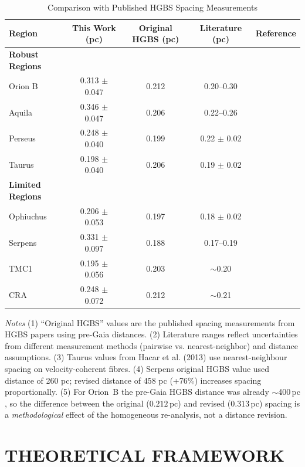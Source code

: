 \documentclass[usenatbib,twoside,twocolumn]{mnras}
\begin{document}
\begin{table}
\caption{Comparison with Published HGBS Spacing Measurements}
\label{tab:literature}
\begin{tabular}{lcccc}
\toprule
Region & This Work (pc) & Original HGBS (pc) & Literature (pc) & Reference \\
\midrule
\textbf{Robust Regions} &  &  &  &  \\
Orion B & 0.313 $\pm$ 0.047 & 0.212 & 0.20--0.30 & \citet{Konyves2020} \\
Aquila  & 0.346 $\pm$ 0.047 & 0.206 & 0.22--0.26 & \citet{Konyves2015} \\
Perseus & 0.248 $\pm$ 0.040 & 0.199 & 0.22 $\pm$ 0.02 & \citet{Pezzuto2021} \\
Taurus  & 0.198 $\pm$ 0.040 & 0.206 & 0.19 $\pm$ 0.02 & \citet{Hacar2013} \\
\midrule
\textbf{Limited Regions} &  &  &  &  \\
Ophiuchus & 0.206 $\pm$ 0.053 & 0.197 & 0.18 $\pm$ 0.02 & \citet{Konyves2020} \\
Serpens  & 0.331 $\pm$ 0.097 & 0.188 & 0.17--0.19 & \citet{Konyves2020} \\
TMC1     & 0.195 $\pm$ 0.056 & 0.203 & $\sim$0.20 & \citet{Hacar2013} \\
CRA      & 0.248 $\pm$ 0.072 & 0.212 & $\sim$0.21 & \citet{Konyves2020} \\
\bottomrule
\end{tabular}

\vspace{0.1in}
\footnotesize
\emph{Notes} (1) ``Original HGBS'' values are the published spacing measurements from HGBS papers using pre-Gaia distances. (2) Literature ranges reflect uncertainties from different measurement methods (pairwise vs. nearest-neighbor) and distance assumptions. (3) Taurus values from Hacar et al. (2013) use nearest-neighbour spacing on velocity-coherent fibres. (4) Serpens original HGBS value used distance of 260 pc; revised distance of 458 pc (+76\%) increases spacing proportionally. (5) For Orion~B the pre-Gaia HGBS distance was already $\sim$400\,pc \citep{Konyves2020}, so the difference between the original ($0.212$\,pc) and revised ($0.313$\,pc) spacing is a \emph{methodological} effect of the homogeneous re-analysis, not a distance revision.
\end{table}

\section{THEORETICAL FRAMEWORK}
\end{document}
